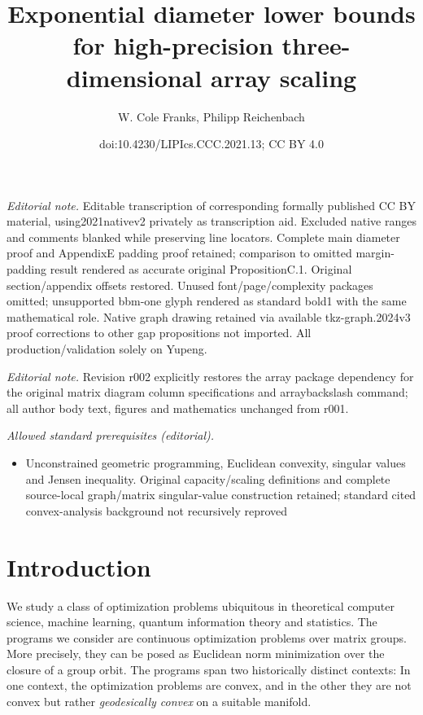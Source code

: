 \documentclass[10pt,a4paper]{article}
\title{Exponential diameter lower bounds for high-precision three-dimensional array scaling}
\author{W. Cole Franks, Philipp Reichenbach}
\date{doi:10.4230/LIPIcs.CCC.2021.13; CC BY 4.0}
\numberwithin{equation}{section}
\begin{document}
\maketitle
\noindent\textit{Editorial note.} Editable transcription of corresponding formally published CC BY material, using2021nativev2 privately as transcription aid. Excluded native ranges and comments blanked while preserving line locators. Complete main diameter proof and AppendixE padding proof retained; comparison to omitted margin-padding result rendered as accurate original PropositionC.1. Original section/appendix offsets restored. Unused font/page/complexity packages omitted; unsupported bbm-one glyph rendered as standard bold1 with the same mathematical role. Native graph drawing retained via available tkz-graph.2024v3 proof corrections to other gap propositions not imported. All production/validation solely on Yupeng.\par\medskip
\noindent\textit{Editorial note.} Revision r002 explicitly restores the array package dependency for the original matrix diagram column specifications and arraybackslash command; all author body text, figures and mathematics unchanged from r001.\par\medskip
\noindent\textit{Allowed standard prerequisites (editorial).}\begin{itemize}
\item Unconstrained geometric programming, Euclidean convexity, singular values and Jensen inequality. Original capacity/scaling definitions and complete source-local graph/matrix singular-value construction retained; standard cited convex-analysis background not recursively reproved
\end{itemize}\medskip
\section{Introduction}
We study a class of optimization problems ubiquitous in theoretical computer science, machine learning,  quantum information theory and statistics. The programs we consider are continuous optimization problems over matrix groups. More precisely, they can be posed as Euclidean norm minimization over the closure of a group orbit. The programs span two historically distinct contexts: In one context, the optimization problems are convex, and in the other they are not convex but rather \emph{geodesically convex} on a suitable manifold.
\end{document}
